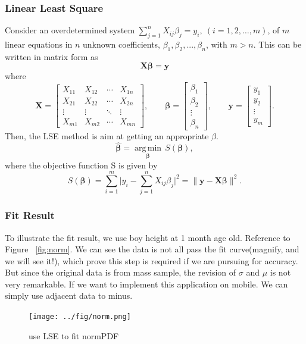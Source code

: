 \documentclass[
10pt, %
a4paper, %
oneside, %
headinclude,footinclude, %
BCOR5mm, %
]{scrartcl}
\begin{document}
\subsubsection{Linear Least Square}
\begin{definition}[LSE]
Consider an overdetermined system
$\sum_{j=1}^{n} X_{ij}\beta_j = y_i,\ (i=1, 2, \dots, m)$,
of $m$ linear equations in $n$ unknown coefficients, $\beta_1,\beta_2,...,\beta_n$, with $m > n$.
This can be written in matrix form as
 \[\mathbf {X} \boldsymbol {\beta} = \mathbf {y}\]
where \[
\mathbf {X}=\begin{bmatrix}
X_{11} & X_{12} & \cdots & X_{1n} \\
X_{21} & X_{22} & \cdots & X_{2n} \\
\vdots & \vdots & \ddots & \vdots \\
X_{m1} & X_{m2} & \cdots & X_{mn}
\end{bmatrix} ,
\qquad \boldsymbol \beta = \begin{bmatrix}
\beta_1 \\ \beta_2 \\ \vdots \\ \beta_n \end{bmatrix} ,
\qquad \mathbf y = \begin{bmatrix}
y_1 \\ y_2 \\ \vdots \\ y_m
\end{bmatrix}. \]
 Then, the LSE method is aim at getting an appropriate $\beta$.
\[
\hat{\boldsymbol{\beta}} = \underset{\boldsymbol{\beta}}{\operatorname{arg\,min}}\,S(\boldsymbol{\beta}),\]
where the objective function S is given by
\[
S(\boldsymbol{\beta}) = \sum_{i=1}^{m}\bigl| y_i - \sum_{j=1}^{n} X_{ij}\beta_j\bigr|^2 = \bigl\|\mathbf y - \mathbf X \boldsymbol \beta \bigr\|^2.
\]
\end{definition}

\subsubsection{Fit Result}
To illustrate the fit result, we use boy height at 1 month age old. Reference to Figure ~\vref{fig:norm}. We can see the data is not all pass the fit curve(magnify, and we will see it!), which prove this step is required if we are pursuing for accuracy.
\\But since the original data is from mass sample, the revision of $\sigma$ and $\mu$ is not very remarkable. If we want to implement this application on mobile. We can simply use adjacent data to minus.
\begin{figure}[tb]
\centering
\texttt{[image: ../fig/norm.png]}
\caption[use LSE to fit normPDF]{use LSE to fit normPDF}
\label{fig:norm}
\end{figure}
\end{document}
